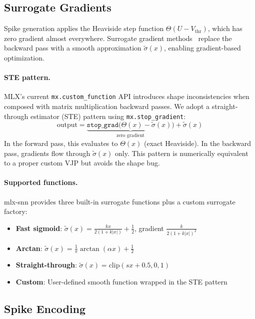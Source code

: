 \documentclass[11pt]{article}
\begin{document}
\subsection{Surrogate Gradients}
\label{sec:surrogates}

Spike generation applies the Heaviside step function $\Theta(U - V_{\text{thr}})$, which has zero gradient almost everywhere. Surrogate gradient methods~\citep{neftci2019surrogate, zenke2021remarkable} replace the backward pass with a smooth approximation $\tilde{\sigma}(x)$, enabling gradient-based optimization.

\paragraph{STE pattern.}
MLX's current \texttt{mx.custom\_function} API introduces shape inconsistencies when composed with matrix multiplication backward passes. We adopt a straight-through estimator (STE) pattern using \texttt{mx.stop\_gradient}:
\begin{equation}
    \text{output} = \underbrace{\texttt{stop\_grad}\big(\Theta(x) - \tilde{\sigma}(x)\big)}_{\text{zero gradient}} + \tilde{\sigma}(x)
    \label{eq:ste}
\end{equation}
In the forward pass, this evaluates to $\Theta(x)$ (exact Heaviside). In the backward pass, gradients flow through $\tilde{\sigma}(x)$ only. This pattern is numerically equivalent to a proper custom VJP but avoids the shape bug.

\paragraph{Supported functions.}
mlx-snn provides three built-in surrogate functions plus a custom surrogate factory:
\begin{itemize}[nosep]
    \item \textbf{Fast sigmoid}: $\tilde{\sigma}(x) = \frac{kx}{2(1+k|x|)} + \frac{1}{2}$, gradient $\frac{k}{2(1+k|x|)^2}$
    \item \textbf{Arctan}: $\tilde{\sigma}(x) = \frac{1}{\pi}\arctan(\alpha x) + \frac{1}{2}$
    \item \textbf{Straight-through}: $\tilde{\sigma}(x) = \text{clip}(sx + 0.5, 0, 1)$
    \item \textbf{Custom}: User-defined smooth function wrapped in the STE pattern
\end{itemize}

\subsection{Spike Encoding}
\end{document}
